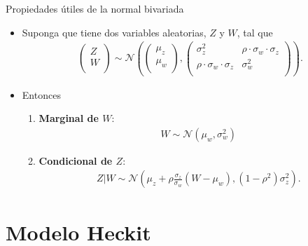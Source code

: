 \documentclass[10pt, xcolor=dvipsnames]{beamer}
\begin{document}
\begin{frame}{Propiedades útiles de la normal bivariada}
\begin{itemize}
	\item Suponga que tiene dos variables aleatorias, $Z$ y $W$, tal que
    \begin{align*}
        \begin{pmatrix}
            Z \\
            W\\
        \end{pmatrix} 
        \sim \mathcal{N}
        \left(
        \begin{pmatrix}
            \mu_z \\
            \mu_w\\
        \end{pmatrix}, 
        \begin{pmatrix}
            \sigma^2_z & \rho \cdot \sigma_w \cdot \sigma_z\\
            \rho \cdot \sigma_w \cdot \sigma_z & \sigma^2_w\\
        \end{pmatrix}
        \right). 
    \end{align*}
        \item Entonces
        \vspace{0.5em}
        \begin{enumerate}
            \item \textbf{Marginal de $W$}:
            \vspace{-1em}        
            \begin{align*}
                W \sim \mathcal{N} \left(\mu_w,\sigma^2_w\right)
            \end{align*}
            \vspace{-1em}
            \item \textbf{Condicional de $Z$}:
            \begin{align*}
                Z|W \sim \mathcal{N} \left(\mu_z + \rho \frac{\sigma_z}{\sigma_w}(W - \mu_w), (1-\rho^2) \sigma^2_z\right). 
            \end{align*}
        \end{enumerate}
\end{itemize}
\end{frame}

\section{Modelo Heckit}
\end{document}
